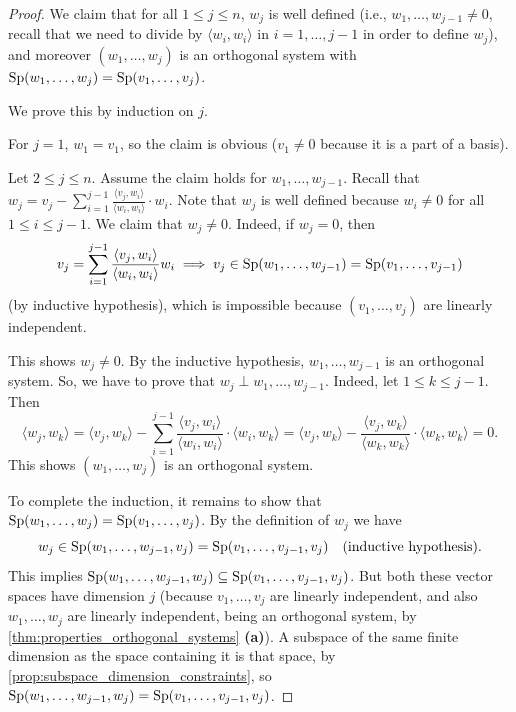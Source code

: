 \begin{proof}
    We claim that for all $1 \leq j \leq n$, $w_j$ is well defined (i.e., $w_1, \dots, w_{j-1} \neq 0$, recall that we need to divide by $\langle w_i, w_i \rangle$ in $i = 1, \dots, j-1$ in order to define $w_j$), and moreover $(w_1, \dots, w_j)$ is an orthogonal system with $\operatorname{Sp}(w_1, \dots, w_j) = \operatorname{Sp}(v_1, \dots, v_j)$.
    
    We prove this by induction on $j$.
    
    For $j = 1$, $w_1 = v_1$, so the claim is obvious ($v_1 \neq 0$ because it is a part of a basis).
    
    Let $2 \leq j \leq n$. Assume the claim holds for $w_1, \dots, w_{j-1}$.
    Recall that $w_j = v_j - \sum_{i=1}^{j-1} \frac{\langle v_j, w_i \rangle}{\langle w_i, w_i \rangle} \cdot w_i$. Note that $w_j$ is well defined because $w_i \neq 0$ for all $1 \leq i \leq j-1$. We claim that $w_j \neq 0$. Indeed, if $w_j = 0$, then 
    \[
        v_j = \sum_{i=1}^{j-1} \frac{\langle v_j, w_i \rangle}{\langle w_i, w_i \rangle} w_i \implies v_j \in \operatorname{Sp}(w_1, \dots, w_{j-1}) = \operatorname{Sp}(v_1, \dots, v_{j-1})
    \]
    (by inductive hypothesis), which is impossible because $(v_1, \dots, v_j)$ are linearly independent.
    
    This shows $w_j \neq 0$. By the inductive hypothesis, $w_1, \dots, w_{j-1}$ is an orthogonal system. So, we have to prove that $w_j \perp w_1, \dots, w_{j-1}$.
    Indeed, let $1 \leq k \leq j-1$. Then
    \[
        \langle w_j, w_k \rangle = \langle v_j, w_k \rangle - \sum_{i=1}^{j-1} \frac{\langle v_j, w_i \rangle}{\langle w_i, w_i \rangle} \cdot \langle w_i, w_k \rangle = \langle v_j, w_k \rangle - \frac{\langle v_j, w_k \rangle}{\langle w_k, w_k \rangle} \cdot \langle w_k, w_k \rangle = 0.
    \]
    This shows $(w_1, \dots, w_j)$ is an orthogonal system. 
    
    To complete the induction, it remains to show that $\operatorname{Sp}(w_1, \dots, w_j) = \operatorname{Sp}(v_1, \dots, v_j)$. By the definition of $w_j$ we have
    \[
        w_j \in \operatorname{Sp}(w_1, \dots, w_{j-1}, v_j) = \operatorname{Sp}(v_1, \dots, v_{j-1}, v_j) \quad \text{(inductive hypothesis)}.
    \]
    This implies $\operatorname{Sp}(w_1, \dots, w_{j-1}, w_j) \subseteq \operatorname{Sp}(v_1, \dots, v_{j-1}, v_j)$. But both these vector spaces have dimension $j$ (because $v_1, \dots, v_j$ are linearly independent, and also $w_1, \dots, w_j$ are linearly independent, being an orthogonal system, by \cref{thm:properties_orthogonal_systems} \textbf{(a)}). A subspace of the same finite dimension as the space containing it is that space, by \cref{prop:subspace_dimension_constraints}, so $\operatorname{Sp}(w_1, \dots, w_{j-1}, w_j) = \operatorname{Sp}(v_1, \dots, v_{j-1}, v_j)$.
\end{proof}

